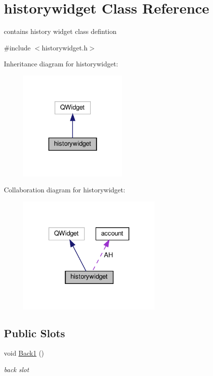 \hypertarget{classhistorywidget}{}\section{historywidget Class Reference}
\label{classhistorywidget}


contains history widget class defintion  




{\ttfamily \#include $<$historywidget.\+h$>$}



Inheritance diagram for historywidget\+:\nopagebreak
\begin{figure}[H]
\begin{center}
\leavevmode
\includegraphics[width=154pt]{classhistorywidget__inherit__graph}
\end{center}
\end{figure}


Collaboration diagram for historywidget\+:\nopagebreak
\begin{figure}[H]
\begin{center}
\leavevmode
\includegraphics[width=204pt]{classhistorywidget__coll__graph}
\end{center}
\end{figure}
\subsection*{Public Slots}
\begin{DoxyCompactItemize}
\item 
void \hyperlink{classhistorywidget_a19aa3f9d16ac28a32b31b340623b0611}{Back1} ()
\begin{DoxyCompactList}\small\item\em back slot \end{DoxyCompactList}\end{DoxyCompactItemize}
